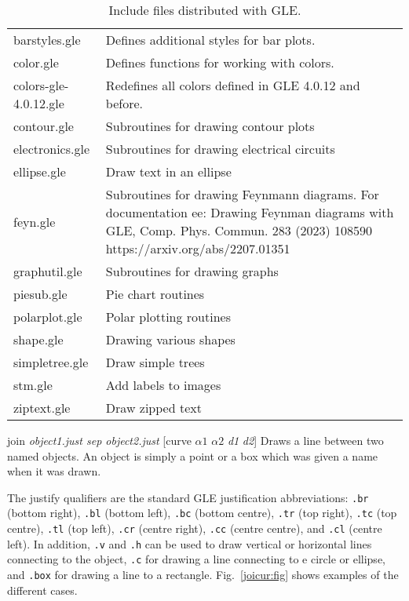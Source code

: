 \begin{commanddescription}
\begin{table}[t]
\centering
\caption{\label{inc:tab}Include files distributed with GLE.}
\begin{tabular}{ll} \hline
barstyles.gle             & Defines additional styles for bar plots.\\
color.gle                 & Defines functions for working with colors.\\
colors-gle-4.0.12.gle     & Redefines all colors defined in GLE 4.0.12 and before.\\
contour.gle               & Subroutines for drawing contour plots\\
electronics.gle           & Subroutines for drawing electrical circuits\\
ellipse.gle               & Draw text in an ellipse\\
feyn.gle                  & Subroutines for drawing Feynmann diagrams.  For documentation ee: Drawing Feynman diagrams with GLE, Comp. Phys. Commun. 283 (2023) 108590 https://arxiv.org/abs/2207.01351 \\
graphutil.gle             & Subroutines for drawing graphs\\
piesub.gle                & Pie chart routines\\
polarplot.gle             & Polar plotting routines\\
shape.gle                 & Drawing various shapes\\
simpletree.gle            & Draw simple trees\\
stm.gle                   & Add labels to images\\
ziptext.gle               & Draw zipped text\\ \hline
\end{tabular}
\end{table}


\item[{\sf join {\it object1.just sep object2.just} [curve {\it $\alpha1$} {\it $\alpha2$} {\it d1} {\it d2}]}]
\label{cmd:join}
Draws a line between two named objects. An object is simply a point or a box which was given a name when it was drawn.

The justify qualifiers are the standard GLE justification abbreviations: \verb#.br# (bottom right), \verb#.bl# (bottom left), \verb#.bc# (bottom centre), \verb#.tr# (top right), \verb#.tc# (top centre), \verb#.tl# (top left), \verb#.cr# (centre right), \verb#.cc# (centre centre), and \verb#.cl# (centre left). In addition, \verb#.v# and \verb#.h# can be used to draw vertical or horizontal lines connecting to the object, \verb#.c# for drawing a line connecting to e circle or ellipse, and \verb#.box# for drawing a line to a rectangle. Fig.~\ref{joicur:fig} shows examples of the different cases.


\end{commanddescription}
